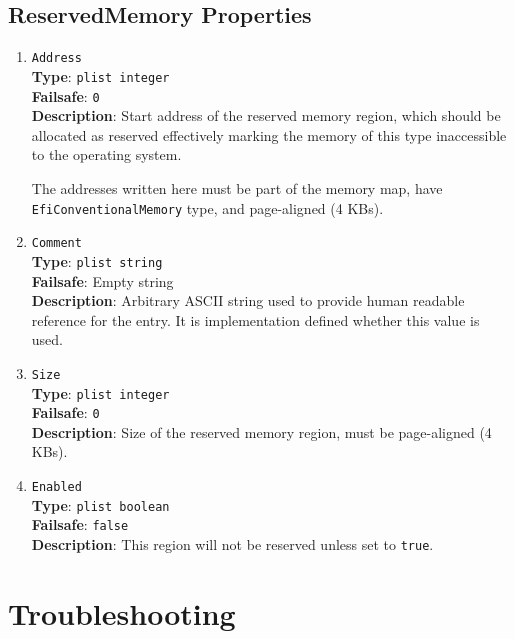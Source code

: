 \documentclass[]{article}
\begin{document}
\subsection{ReservedMemory Properties}\label{uefirsvdprops}

\begin{enumerate}

\item
  \texttt{Address}\\
  \textbf{Type}: \texttt{plist\ integer}\\
  \textbf{Failsafe}: \texttt{0}\\
  \textbf{Description}: Start address of the reserved memory region, which should be allocated
  as reserved effectively marking the memory of this type inaccessible to the operating system.

  The addresses written here must be part of the memory map, have \texttt{EfiConventionalMemory}
  type, and page-aligned (4 KBs).

\item
  \texttt{Comment}\\
  \textbf{Type}: \texttt{plist\ string}\\
  \textbf{Failsafe}: Empty string\\
  \textbf{Description}: Arbitrary ASCII string used to provide human readable
  reference for the entry. It is implementation defined whether this value is
  used.

\item
  \texttt{Size}\\
  \textbf{Type}: \texttt{plist\ integer}\\
  \textbf{Failsafe}: \texttt{0}\\
  \textbf{Description}: Size of the reserved memory region, must be page-aligned (4 KBs).

\item
  \texttt{Enabled}\\
  \textbf{Type}: \texttt{plist\ boolean}\\
  \textbf{Failsafe}: \texttt{false}\\
  \textbf{Description}: This region will not be reserved unless set to \texttt{true}.

\end{enumerate}

\section{Troubleshooting}\label{troubleshooting}
\end{document}
